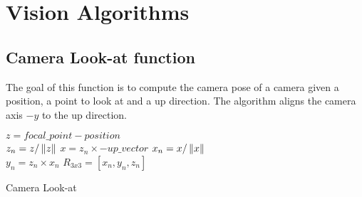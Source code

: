 \section{Vision Algorithms}

\subsection{Camera Look-at function}
The goal of this function is to compute the camera pose of a camera given a position, a point to look at and a up direction. The algorithm aligns the camera axis $-y$ to the up direction.

\begin{algorithm}[H]
\DontPrintSemicolon
{}
$z = focal\_point - position $ \\
$z_n = z / \left\lVert z\right\rVert$ 
$x = z_n \times -up\_vector$ 
$x_n = x/\left\lVert x\right\rVert$ \\
$y_n = z_n \times x_n$ 
$R_{3x3} = [x_n, y_n, z_n]$ 
\caption{Camera Look-at}
\end{algorithm}
